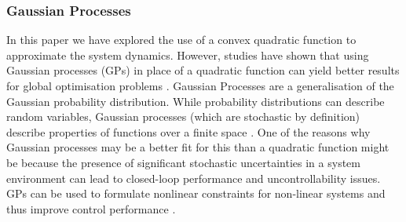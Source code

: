 \documentclass[conference]{IEEEtran}
\theoremstyle{definition}
\begin{document}
\subsubsection{Gaussian Processes}
In this paper we have explored the use of a convex quadratic function to approximate the system dynamics. However, studies have shown that using Gaussian processes (GPs) in place of a quadratic function can yield better results for global optimisation problems \cite{Osborne}. Gaussian Processes are a generalisation of the Gaussian probability distribution. While probability distributions can describe random variables, Gaussian processes (which are stochastic by definition) describe properties of functions over a finite space \cite{Rasmussen}. One of the reasons why Gaussian processes may be a better fit for this than a quadratic function might be because the presence of significant stochastic uncertainties in a system environment can lead to closed-loop performance and uncontrollability issues. GPs can be used to formulate nonlinear constraints for non-linear systems and thus improve control performance \cite{Stochastic}.
\end{document}
